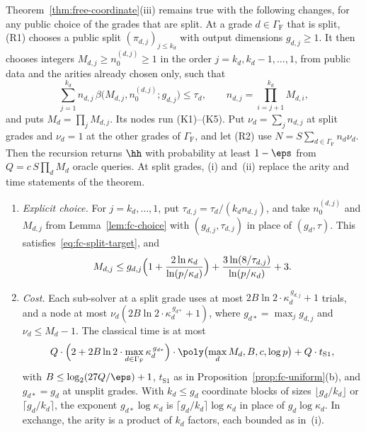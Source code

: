 \begin{proposition}
\label{prop:fc-split}
Theorem~\ref{thm:free-coordinate}(iii) remains true with the following changes, for any public choice of the grades that are split. At a grade $d \in \Gamma_{\mathrm F}$ that is split, (R1) chooses a public split $(\pi_{d,j})_{j \le k_d}$ with output dimensions $g_{d,j} \ge 1$. It then chooses integers $M_{d,j} \ge n_0^{(d,j)} \ge 1$ in the order $j = k_d, k_d-1, \dots, 1$, from public data and the arities already chosen only, such that
\begin{equation}
  \label{eq:fc-split-target}
  \sum_{j=1}^{k_d} n_{d,j}\,\beta\bigl(M_{d,j}, n_0^{(d,j)}; g_{d,j}\bigr) \le \tau_d, \qquad n_{d,j} = \prod_{i=j+1}^{k_d}M_{d,i},
\end{equation}
and puts $M_d = \prod_jM_{d,j}$. Its nodes run (K1)--(K5). Put $\nu_d = \sum_jn_{d,j}$ at split grades and $\nu_d = 1$ at the other grades of $\Gamma_{\mathrm F}$, and let (R2) use $N = S\sum_{d\in\Gamma_{\mathrm F}}n_d\nu_d$. Then the recursion returns $\hh$ with probability at least $1-\eps$ from $Q = c\,S\prod_dM_d$ oracle queries. At split grades, (i) and~(ii) replace the arity and time statements of the theorem.
\begin{enumerate}[label=(\roman*),leftmargin=2em]
  \item \emph{Explicit choice.} For $j = k_d,\dots,1$, put $\tau_{d,j} = \tau_d/(k_dn_{d,j})$, and take $n_0^{(d,j)}$ and $M_{d,j}$ from Lemma~\ref{lem:fc-choice} with $(g_{d,j}, \tau_{d,j})$ in place of $(g_d, \tau)$. This satisfies~\eqref{eq:fc-split-target}, and
  \[
    M_{d,j} \le g_{d,j}\Bigl(1 + \frac{2\ln\kappa_d}{\ln(p/\kappa_d)}\Bigr) + \frac{3\ln(8/\tau_{d,j})}{\ln(p/\kappa_d)} + 3 .
  \]
  \item \emph{Cost.} Each sub-solver at a split grade uses at most $2B\ln 2\cdot\kappa_d^{\,g_{d,j}} + 1$ trials, and a node at most $\nu_d(2B\ln 2\cdot\kappa_d^{\,g_{d*}} + 1)$, where $g_{d*} = \max_jg_{d,j}$ and $\nu_d \le M_d - 1$. The classical time is at most
  \[
    Q\cdot\Bigl(2 + 2B\ln 2\cdot\max_{d\in\Gamma_{\mathrm F}}\kappa_d^{\,g_{d*}}\Bigr)\cdot\poly\bigl(\max_dM_d, B, c, \log p\bigr) + Q\cdot t_{\mathrm{S1}},
  \]
  with $B \le \log_2(27Q/\eps) + 1$, $t_{\mathrm{S1}}$ as in Proposition~\ref{prop:fc-uniform}(b), and $g_{d*} = g_d$ at unsplit grades. With $k_d \le g_d$ coordinate blocks of sizes $\lfloor g_d/k_d\rfloor$ or $\lceil g_d/k_d\rceil$, the exponent $g_{d*}\log\kappa_d$ is $\lceil g_d/k_d\rceil\log\kappa_d$ in place of $g_d\log\kappa_d$. In exchange, the arity is a product of $k_d$ factors, each bounded as in~(i).
\end{enumerate}
\end{proposition}

